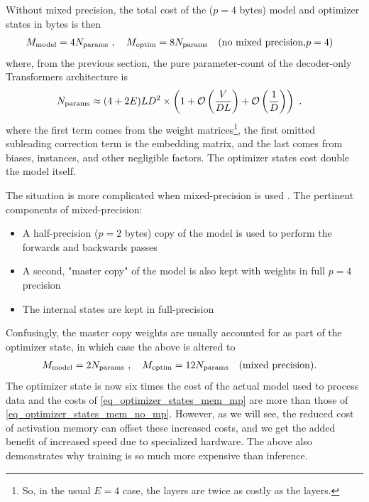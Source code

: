 \documentclass[11pt]{article}
\begin{document}
Without mixed precision, the total cost of the
 ($ p=4 $ bytes) model and optimizer states in bytes is then
\begin{align}
	M _{ \rm model} & = 4 N _{ \rm params } \ , \quad M_{ \rm  optim } = 8 N _{ \rm params }
	\quad ({\rm no \ mixed \ precision, } p=4)
	\label{eq_optimizer_states_mem_no_mp}
\end{align}
where, from the previous section, the pure parameter-count of the decoder-only Transformers
architecture is
\begin{align}
	N _{ \rm params } & \approx  (4 + 2E) L D ^{ 2 } \times \left ( 1 + \mathcal{O} \left( \frac{ V }{ DL }
		\right) + \mathcal{O} \left( \frac{ 1 }{ D } \right)  \right ) \ . \label{eq_approx_params_no_sharding}
\end{align}
where the first term comes from the  weight matrices\footnote{So,
	in the usual $ E=4 $ case, the  layers are twice as costly as the
	 layers.}, the first omitted subleading correction term is the embedding
matrix, and the last comes from biases,  instances, and other negligible
factors.  The optimizer states cost double the model itself.


The situation is more complicated when mixed-precision is used \cite{micikevicius2018mixed}.
The pertinent components of mixed-precision:
\begin{itemize}
	\item A half-precision ($ p=2 $ bytes) copy of the model is used to perform the forwards and
	      backwards passes
	\item A second, "master copy" of the model is also kept with weights in full $ p=4 $ precision
	\item The internal  states are kept in full-precision
\end{itemize}
Confusingly, the master copy weights are usually accounted for as part of the optimizer state, in
which case the above is altered to
\begin{align}
	M _{ \rm model} & = 2 N _{ \rm params } \ , \quad M_{ \rm  optim } = 12 N _{ \rm params }
	\quad ({\rm mixed \ precision}) .
	\label{eq_optimizer_states_mem_mp}
\end{align}
The optimizer state is now six times the cost of the actual model used to process data and the costs
of \eqref{eq_optimizer_states_mem_mp} are more than those of \eqref{eq_optimizer_states_mem_no_mp}.
However, as we will see, the reduced cost of activation memory can offset these increased costs, and
we get the added benefit of increased speed due to specialized hardware. The above also demonstrates
why training is so much more expensive than inference.
\end{document}
